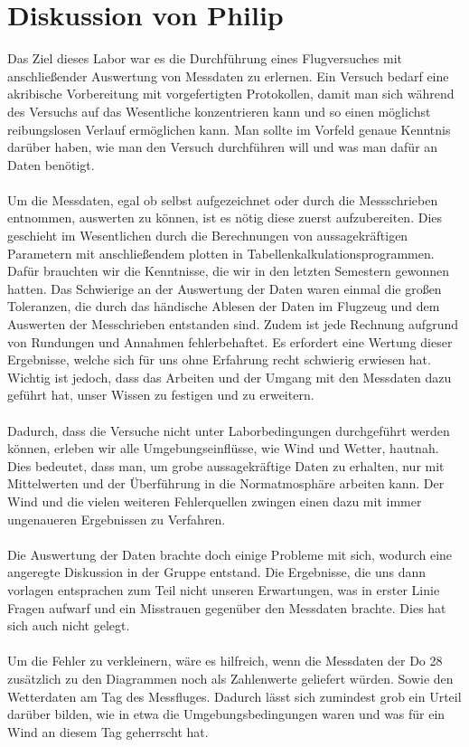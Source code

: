 \newpage

\section{Diskussion von Philip}
Das Ziel dieses Labor war es die Durchführung eines Flugversuches mit anschließender Auswertung von Messdaten zu erlernen. Ein Versuch bedarf eine akribische Vorbereitung mit vorgefertigten Protokollen, damit man sich während des Versuchs auf das Wesentliche konzentrieren kann und so einen möglichst reibungslosen Verlauf ermöglichen kann. Man sollte im Vorfeld genaue Kenntnis darüber haben, wie man den Versuch durchführen will und was man dafür an Daten benötigt. \\\\
Um die Messdaten, egal ob selbst aufgezeichnet oder durch die Messschrieben entnommen, auswerten zu können, ist es nötig diese zuerst aufzubereiten. Dies geschieht im Wesentlichen durch die Berechnungen von aussagekräftigen Parametern mit anschließendem plotten in Tabellenkalkulationsprogrammen. Dafür brauchten wir die Kenntnisse, die wir in den letzten Semestern gewonnen hatten. Das Schwierige an der Auswertung der Daten waren einmal die großen Toleranzen, die durch das händische Ablesen der Daten im Flugzeug und dem Auswerten der Messchrieben entstanden sind. Zudem ist jede Rechnung aufgrund von Rundungen und Annahmen fehlerbehaftet. Es erfordert eine Wertung dieser Ergebnisse, welche sich für uns ohne Erfahrung recht schwierig erwiesen hat. Wichtig ist jedoch, dass das Arbeiten und der Umgang mit den Messdaten dazu geführt hat, unser Wissen zu festigen und zu erweitern.\\\\
Dadurch, dass die Versuche nicht unter Laborbedingungen durchgeführt werden können, erleben wir alle Umgebungseinflüsse, wie Wind und Wetter, hautnah. Dies bedeutet, dass man, um grobe aussagekräftige Daten zu erhalten, nur mit Mittelwerten und der Überführung in die Normatmosphäre arbeiten kann. Der Wind und die vielen weiteren Fehlerquellen zwingen einen dazu mit immer ungenaueren Ergebnissen zu Verfahren. \\\\
Die Auswertung der Daten brachte doch einige Probleme mit sich, wodurch eine angeregte Diskussion in der Gruppe entstand. Die Ergebnisse, die uns dann vorlagen entsprachen zum Teil nicht unseren Erwartungen, was in erster Linie Fragen aufwarf und ein Misstrauen gegenüber den Messdaten brachte. Dies hat sich auch nicht gelegt.
\\\\
Um die Fehler zu verkleinern, wäre es hilfreich, wenn die Messdaten der Do 28 zusätzlich zu den Diagrammen noch als Zahlenwerte geliefert würden. Sowie den Wetterdaten am Tag des Messfluges. Dadurch lässt sich zumindest grob ein Urteil darüber bilden, wie in etwa die Umgebungsbedingungen waren und was für ein Wind an diesem Tag geherrscht hat. 

